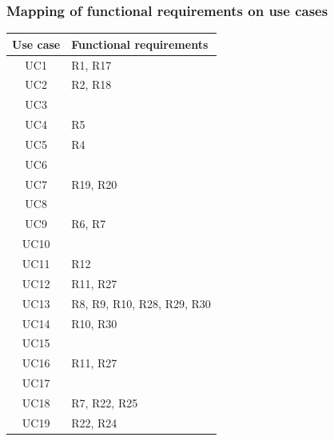 \subsubsection*{Mapping of functional requirements on use cases}
\begin{center}
    \def\arraystretch{1.5}
    \begin{longtable}[H]{|c|l|}
        \hline
        \textbf{Use case} & \textbf{Functional requirements} \\ \hline
        UC1               & R1, R17                          \\ \hline
        UC2               & R2, R18                          \\ \hline
        UC3               &                                  \\ \hline
        UC4               & R5                               \\ \hline
        UC5               & R4                               \\ \hline
        UC6               &                                  \\ \hline
        UC7               & R19, R20                         \\ \hline
        UC8               &                                  \\ \hline
        UC9               & R6, R7                           \\ \hline
        UC10              &                                  \\ \hline
        UC11              & R12                              \\ \hline
        UC12              & R11, R27                         \\ \hline
        UC13              & R8, R9, R10, R28, R29, R30       \\ \hline
        UC14              & R10, R30                         \\ \hline
        UC15              &                                  \\ \hline
        UC16              & R11, R27                         \\ \hline
        UC17              &                                  \\ \hline
        UC18              & R7, R22, R25                     \\ \hline
        UC19              & R22, R24                         \\ \hline
    \end{longtable}
\end{center}

